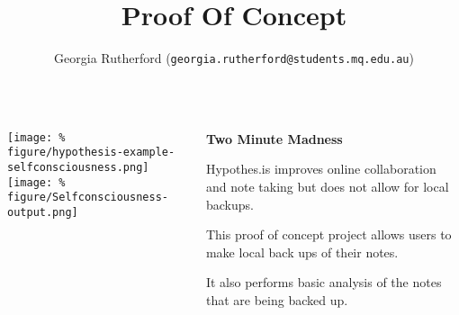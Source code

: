 \documentclass[unknownkeysallowed,usepdftitle=false, parskip=full]{beamer}
\title{Proof Of Concept}
\author{Georgia Rutherford (\texttt{georgia.rutherford@students.mq.edu.au})}
\institute{Macquarie University}
\newcommand{\secvariable}{nothing}
\newcommand{\mysection}[1]{\renewcommand{\secvariable}{#1}
}
\begin{document}
\mysection{abstract}
\begin{frame}\label{\secvariable}

  \begin{columns}[t]
  \begin{column}[c]{0.44\textwidth}
\texttt{[image: \%
figure/hypothesis-example-selfconsciousness.png]}\\
\vspace{12pt}
\texttt{[image: \%
figure/Selfconsciousness-output.png]}
    \end{column}
    \begin{column}[c]{0.45\textwidth}
    \parbox{\linewidth}{
\textbf{Two Minute Madness}
  \vspace{12pt}
  
     Hypothes.is improves online collaboration and note taking but does not allow for local backups. 
     
     \vspace{12pt}
     This proof of concept project allows users to make local back ups of their notes. 
     
     \vspace{12pt}
     
     It also performs basic analysis of the notes that are being backed up.
      
      
      
      
      }
 \end{column}
 \end{columns}   

   
\end{frame}
\end{document}
